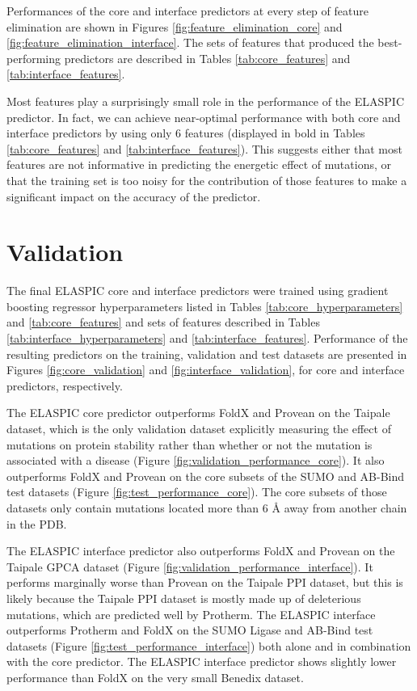 Performances of the core and interface predictors at every step of feature elimination are shown in Figures \ref{fig:feature_elimination_core} and \ref{fig:feature_elimination_interface}. The sets of features that produced the best-performing predictors are described in Tables \ref{tab:core_features} and \ref{tab:interface_features}.

Most features play a surprisingly small role in the performance of the ELASPIC predictor. In fact, we can achieve near-optimal performance with both core and interface predictors by using only 6 features (displayed in bold in Tables \ref{tab:core_features} and \ref{tab:interface_features}). This suggests either that most features are not informative in predicting the energetic effect of mutations, or that the training set is too noisy for the contribution of those features to make a significant impact on the accuracy of the predictor.

\clearpage



\clearpage
\section{Validation}

The final ELASPIC core and interface predictors were trained using gradient boosting regressor hyperparameters listed in Tables \ref{tab:core_hyperparameters} and \ref{tab:core_features} and sets of features described in Tables \ref{tab:interface_hyperparameters} and \ref{tab:interface_features}. Performance of the resulting predictors on the training, validation and test datasets are presented in Figures \ref{fig:core_validation} and \ref{fig:interface_validation}, for core and interface predictors, respectively.

The ELASPIC core predictor outperforms FoldX and Provean on the Taipale dataset, which is the only validation dataset explicitly measuring the effect of mutations on protein stability rather than whether or not the mutation is associated with a disease (Figure \ref{fig:validation_performance_core}). It also outperforms FoldX and Provean on the core subsets of the SUMO and AB-Bind test datasets (Figure \ref{fig:test_performance_core}). The core subsets of those datasets only contain mutations located more than 6 {\AA} away from another chain in the PDB.

The ELASPIC interface predictor also outperforms FoldX and Provean on the Taipale GPCA dataset (Figure \ref{fig:validation_performance_interface}). It performs marginally worse than Provean on the Taipale PPI dataset, but this is likely because the Taipale PPI dataset is mostly made up of deleterious mutations, which are predicted well by Protherm. The ELASPIC interface outperforms Protherm and FoldX on the SUMO Ligase and AB-Bind test datasets (Figure \ref{fig:test_performance_interface}) both alone and in combination with the core predictor. The ELASPIC interface predictor shows slightly lower performance than FoldX on the very small Benedix dataset.

